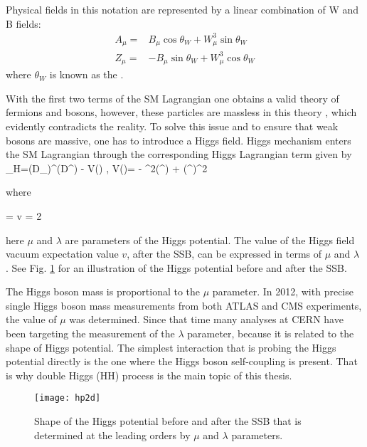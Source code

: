 Physical fields in this notation are represented by a linear combination of W and B fields:
\begin{align}\label{neutral_fields}
A_\mu = &  B_\mu \cos\theta_W + W^3_\mu \sin\theta_W \\ 
Z_\mu = & -B_\mu \sin\theta_W + W^3_\mu \cos\theta_W \nonumber 
\end{align}
\noindent where $\theta_W$ is known as the  \cite{Weinberg:799984}.

With the first two terms of the SM Lagrangian one obtains a valid theory of fermions and bosons, however, these particles are massless in this theory \cite{Wolf:2015kua}, which evidently contradicts the reality. To solve this issue and to ensure that weak bosons are massive, one has to introduce a Higgs field. Higgs mechanism enters the SM Lagrangian through the corresponding Higgs Lagrangian term given by 
\beqn\label{lagr_higgs}
\Lagr_H=(D_\mu\Phi)^\dagger(D^\mu\Phi) - V(\Phi) , \qquad V(\Phi)= - \mu^2(\Phi^\dagger\Phi) + (\Phi^\dagger\Phi)^2
\eeqn

\noindent where

\beqn\label{vev}
\Phi =  \quad {} \quad v = 2 
\eeqn

\noindent here $\mu$ and $\lambda$ are parameters of the Higgs potential. The value of the Higgs field vacuum expectation value $v$, after the SSB, can be expressed in terms of $\mu$ and $\lambda$ \cite{MonroyMontanez:2639240}. See Fig. \ref{hp2d} for an illustration of the Higgs potential before and after the SSB.

The Higgs boson mass is proportional to the $\mu$ parameter. In 2012, with precise single Higgs boson mass measurements from both ATLAS and CMS experiments, the value of $\mu$ was determined. Since that time many analyses at CERN have been targeting the measurement of the $\lambda$ parameter, because it is related to the shape of Higgs potential. The simplest interaction that is probing the Higgs potential directly is the one where the Higgs boson self-coupling is present. That is why double Higgs (HH) process is the main topic of this thesis.



\begin{figure}[H]
\centering
\texttt{[image: hp2d]}
\caption[SSB Potential form]{Shape of the Higgs potential before and after the SSB that is determined at the leading orders by $\mu$ and $\lambda$ parameters. }
\label{hp2d}
\end{figure}

